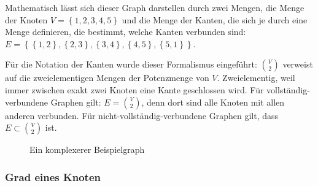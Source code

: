 \documentclass{scrartcl}
\begin{document}
Mathematisch lässt sich dieser Graph darstellen durch zwei Mengen, die Menge der Knoten $V = \left\{1, 2, 3, 4, 5\right\}$ und die
Menge der Kanten, die sich je durch eine Menge definieren, die bestimmt, welche Kanten verbunden sind: 
$E = \left\{\left\{1, 2\right\}, \left\{2, 3\right\}, \left\{3, 4\right\}, \left\{4, 5\right\}, \left\{5, 1\right\}\right\}$.

Für die Notation der Kanten wurde dieser Formalismus eingeführt: $\binom{V}{2}$ verweist auf die zweielementigen Mengen der Potenzmenge
von $V$. Zweielementig, weil immer zwischen exakt zwei Knoten eine Kante geschlossen wird. Für vollständig-verbundene Graphen gilt:
$E = \binom{V}{2}$, denn dort sind alle Knoten mit allen anderen verbunden. Für nicht-vollständig-verbundene Graphen gilt, dass
$E \subset \binom{V}{2}$ ist.

\begin{figure}
	\caption{Ein komplexerer Beispielgraph}
	\label{komplexergraph}
\end{figure}

\subsubsection{Grad eines Knoten}
\end{document}
